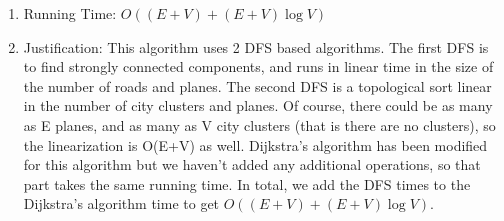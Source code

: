 \documentclass[11pt]{article}
\begin{document}
\begin{enumerate}
\item Running Time: $O((E+V)+(E+V) \log V)$
\item Justification: This algorithm uses 2 DFS based algorithms. The first DFS is to find strongly connected components, and runs in linear time in the size of the number of roads and planes. The second DFS is a topological sort linear in the number of city clusters and planes. Of course, there could be as many as E planes, and as many as V city clusters (that is there are no clusters), so the linearization is O(E+V) as well. Dijkstra's algorithm has been modified for this algorithm but we haven't added any additional operations, so that part takes the same running time. In total, we add the DFS times to the Dijkstra's algorithm time to get $O((E+V)+(E+V) \log V)$.
\end{enumerate}
\begin{algorithm}
\end{algorithm}

\newpage
\end{document}
